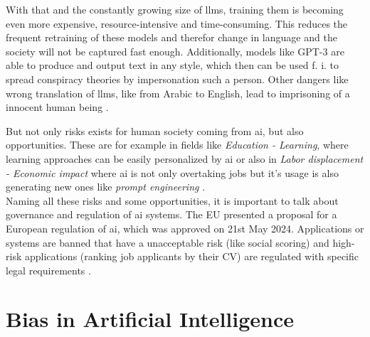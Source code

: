With that and the constantly growing size of \acrshort{llms}, training them is becoming even more expensive, resource-intensive and time-consuming. This reduces the frequent retraining of these models and therefor change in language and the society will not be captured fast enough. Additionally, models like GPT-3 \citep{gpt3} are able to produce and output text in any style, which then can be used f. i. to spread conspiracy theories by impersonation such a person. Other dangers like wrong translation of \acrshort{llms}, like from Arabic to English, lead to imprisoning of a innocent human being  \citep{stochasticparrots}. 

But not only risks exists for human society coming from \acrshort{ai}, but also opportunities. These are for example in fields like \textit{Education - Learning}, where learning approaches can be easily personalized by \acrshort{ai} or also in \textit{Labor displacement - Economic impact} where \acrshort{ai} is not only overtaking jobs but it's usage is also generating new ones like \textit{prompt engineering} \citep{hagendorff-mapping}.
\\

Naming all these risks and some opportunities, it is important to talk about governance and regulation of \acrshort{ai} systems. The EU presented a proposal for a European regulation of \acrshort{ai}, which was approved on 21st May 2024. Applications or systems are banned that have a unacceptable risk (like social scoring) and high-risk applications (ranking job applicants by their CV) are regulated with specific legal requirements \citep{eu-ai-act}. 


\section{Bias in Artificial Intelligence}

